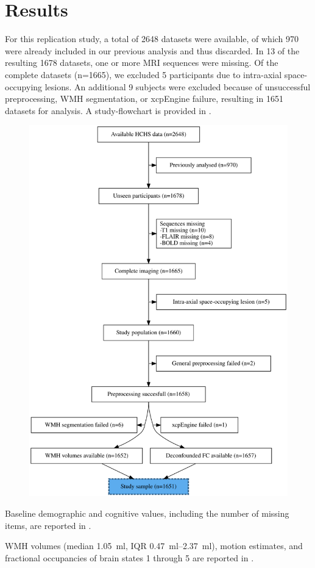 \section{Results}
For this replication study, a total of \num{2648} datasets were available, of which \num{970} were already included in our previous analysis and thus discarded. In \num{13} of the resulting \num{1678} datasets, one or more MRI sequences were missing. Of the complete datasets (n=\num{1665}), we excluded \num{5} participants due to intra-axial space-occupying lesions. An additional \num{9} subjects were excluded because of unsuccessful preprocessing, WMH segmentation, or xcpEngine failure, resulting in \num{1651} datasets for analysis. A study-flowchart is provided in .

\begin{figure}
    \includegraphics[width=0.5\linewidth]{./../analysis/code/R/FLOW.png}
    \label{fig:flowchart}
\end{figure}






Baseline demographic and cognitive values, including the number of missing items, are reported in .

WMH volumes (median \qty{1.05}{\milli\litre}, IQR \qtyrange{0.47}{2.37}{\milli\litre}), motion estimates, and fractional occupancies of brain states 1 through 5 are reported in . 



